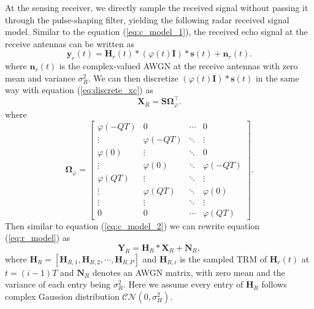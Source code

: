 \documentclass[lettersize,journal]{IEEEtran}
\begin{document}
At the sensing receiver, we directly sample the received signal without passing it through the pulse-shaping filter, yielding the following radar received signal model. Similar to the equation (\ref{eq:c_model_1}), the received echo signal at the receive antennas can be written as
\begin{equation}
\label{eq:r_model}
    \mathbf{y}_r(t) = \mathbf{H}_r(t) * (\varphi(t)\mathbf{I}) * \mathbf{s}(t) + \mathbf{n}_r(t).
\end{equation}
where $\mathbf{n}_r(t)$ is the complex-valued AWGN at the receive antennas with zero mean and variance $\sigma_R^2$. We can then discretize $(\varphi(t)\mathbf{I}) * \mathbf{s}(t)$ in the same way with equation (\ref{eq:discrete_xc}) as
\begin{equation}
\label{eq:discrete_xr}
    \mathbf{X}_R = \mathbf{S}\mathbf{\Omega}_{\varphi}^{\top}.
\end{equation}
where 
\begin{equation}
\label{eq:define_omega_varphi}
    \mathbf{\Omega}_{\varphi} = 
    \begin{bmatrix}
        \varphi(-QT) & 0 & \cdots & 0 \\
        \vdots & \varphi(-QT) & \ddots & \vdots \\
        \varphi(0) & \vdots & \ddots & 0 \\
        \vdots & \varphi(0) & \ddots & \varphi(-QT) \\
        \varphi(QT) & \vdots & \ddots & \vdots \\
        \vdots & \varphi(QT) & \ddots & \varphi(0) \\
        \vdots & \vdots & \ddots & \vdots \\
        0 & 0 & \cdots & \varphi(QT)
    \end{bmatrix}.
\end{equation}
Then similar to equation (\ref{eq:c_model_2}) we can rewrite equation (\ref{eq:r_model}) as
\begin{equation}
\label{eq:r_model_1}
    \mathbf{Y}_R = \mathbf{H}_R*\mathbf{X}_R + \mathbf{N}_R,
\end{equation}
where $\mathbf{H}_R=[\mathbf{H}_{R,1},\mathbf{H}_{R,2},\cdots,\mathbf{H}_{R,P}]$ and $\mathbf{H}_{R,i}$ is the sampled TRM of $\mathbf{H}_r(t)$ at $t=(i-1)T$ and $\mathbf{N}_R$ denotes an AWGN matrix, with zero mean and the variance of each entry being $\sigma_R^2$. Here we assume every entry of $\mathbf{H}_R$ follows complex Gaussion distribution $\mathcal{CN}(0,\sigma_H^2)$.
\end{document}

